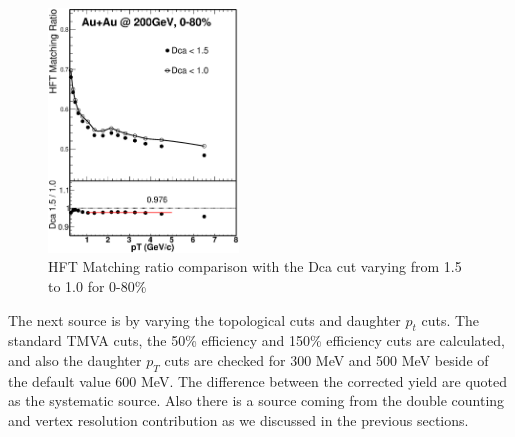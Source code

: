 \begin{figure}[htbp]
\centering
\includegraphics[keepaspectratio,width=0.45\textwidth]{figure/Run14_D0HFT/HFTMatching_Dca_Ratio_7.eps}
\caption{HFT Matching ratio comparison with the Dca cut varying from 1.5 to 1.0 for 0-80\% }
\label{HFTMatching_Dca_Ratio_7}
\end{figure}


The next source is by varying the topological cuts and daughter $p_t$ cuts. The standard TMVA cuts, the 50\% efficiency and 150\% efficiency cuts are calculated, and also the daughter $p_T$ cuts are checked for 300 MeV and 500 MeV beside of the default value 600 MeV. The difference between the corrected yield are quoted as the systematic source. Also there is a source coming from the double counting and vertex resolution contribution as we discussed in the previous sections.

